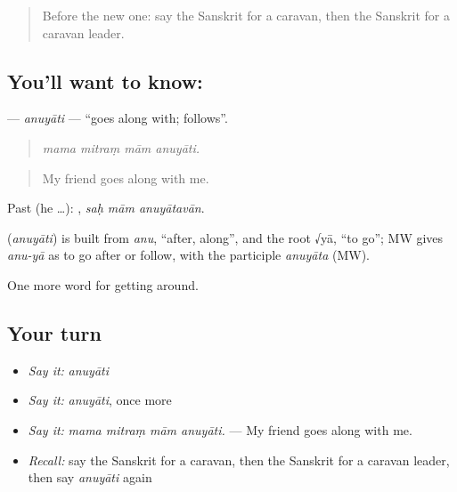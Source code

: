 \label{lesson:SA-C395-anuyati}



\begin{quote}
Before the new one: say the Sanskrit for a caravan, then the Sanskrit for a caravan leader.
\end{quote}

\subsection*{You'll want to know: }
\textbf{} — \emph{anuyāti} — \textquotedblleft{}goes along with; follows\textquotedblright{}.

\begin{quote}
   
\end{quote}

\begin{quote}
\emph{mama mitraṃ mām anuyāti.}
\end{quote}

\begin{quote}
My friend goes along with me.
\end{quote}

Past (he …):   , \emph{saḥ mām anuyātavān}.

\begin{cousinweb}
\textbf{} (\emph{anuyāti}) is built from \emph{anu}, \textquotedblleft{}after, along\textquotedblright{}, and the root √yā, \textquotedblleft{}to go\textquotedblright{}; MW gives \emph{anu-yā} as to go after or follow, with the participle \emph{anuyāta} (MW).
\end{cousinweb}

\begin{grammarlens}[title={What you've built}]
One more word for getting around.
\end{grammarlens}

\subsection*{Your turn}
\begin{itemize}
\raggedright
  \item \emph{Say it:} \emph{anuyāti}
  \item \emph{Say it:} \emph{anuyāti}, once more
  \item \emph{Say it:} \emph{mama mitraṃ mām anuyāti.} — My friend goes along with me.
  \item \emph{Recall:} say the Sanskrit for a caravan, then the Sanskrit for a caravan leader, then say \emph{anuyāti} again
\end{itemize}

